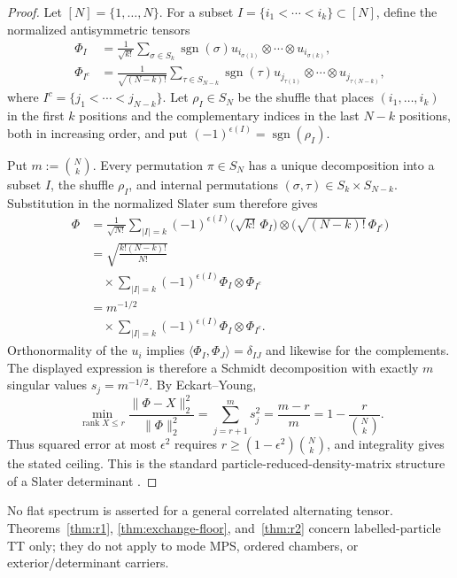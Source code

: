 \documentclass[aps,pra,reprint,superscriptaddress,nofootinbib,longbibliography,showkeys]{revtex4-2}
\theoremstyle{definition}
\newcommand{\rank}{\operatorname{rank}}
\begin{document}
\begin{proof}
Let $[N]=\{1,\ldots,N\}$.  For a subset
$I=\{i_1<\cdots<i_k\}\subset[N]$, define the normalized antisymmetric tensors
\begin{align}
\Phi_I&=\frac{1}{\sqrt{k!}}
\sum_{\sigma\in S_k}\operatorname{sgn}(\sigma)
u_{i_{\sigma(1)}}\otimes\cdots\otimes u_{i_{\sigma(k)}},\nonumber\\
\Phi_{I^c}&=\frac{1}{\sqrt{(N-k)!}}
\sum_{\tau\in S_{N-k}}\operatorname{sgn}(\tau)
u_{j_{\tau(1)}}\otimes\cdots\otimes u_{j_{\tau(N-k)}},
\end{align}
where $I^c=\{j_1<\cdots<j_{N-k}\}$.  Let $\rho_I\in S_N$ be the shuffle that
places $(i_1,\ldots,i_k)$ in the first $k$ positions and the complementary
indices in the last $N-k$ positions, both in increasing order, and put
$(-1)^{\epsilon(I)}=\operatorname{sgn}(\rho_I)$.

Put $m:=\binom Nk$.  Every permutation $\pi\in S_N$ has a unique decomposition into a subset $I$,
the shuffle $\rho_I$, and internal permutations
$(\sigma,\tau)\in S_k\times S_{N-k}$.  Substitution in the normalized Slater
sum therefore gives
\begin{align}
\Phi
&=\frac{1}{\sqrt{N!}}
\sum_{|I|=k}(-1)^{\epsilon(I)}
\bigl(\sqrt{k!}\,\Phi_I\bigr)
\otimes\bigl(\sqrt{(N-k)!}\,\Phi_{I^c}\bigr)\nonumber\\
&=\sqrt{\frac{k!(N-k)!}{N!}}\nonumber\\[-2pt]
&\quad\times
\sum_{|I|=k}(-1)^{\epsilon(I)}\Phi_I\otimes\Phi_{I^c}
\nonumber\\
&=m^{-1/2}\nonumber\\[-2pt]
&\quad\times
\sum_{|I|=k}(-1)^{\epsilon(I)}\Phi_I\otimes\Phi_{I^c}.
\end{align}
Orthonormality of the $u_i$ implies
$\langle\Phi_I,\Phi_J\rangle=\delta_{IJ}$ and likewise for the complements.
The displayed expression is therefore a Schmidt decomposition with exactly
$m$ singular values $s_j=m^{-1/2}$.  By Eckart--Young,
\begin{equation}
\min_{\rank X\le r}\frac{\|\Phi-X\|_2^2}{\|\Phi\|_2^2}
=\sum_{j=r+1}^{m}s_j^2=\frac{m-r}{m}=1-\frac r{\binom Nk}.
\end{equation}
Thus squared error at most $\epsilon^2$ requires
$r\ge(1-\epsilon^2)\binom Nk$, and integrality gives the stated ceiling.  This
is the standard particle-reduced-density-matrix structure of a Slater
determinant \cite{Coleman1963FermionRDM}.
\end{proof}

No flat spectrum is asserted for a general correlated alternating tensor.
Theorems~\ref{thm:r1}, \ref{thm:exchange-floor}, and~\ref{thm:r2} concern
labelled-particle TT only; they do
not apply to mode MPS, ordered chambers, or exterior/determinant carriers.
\end{document}
